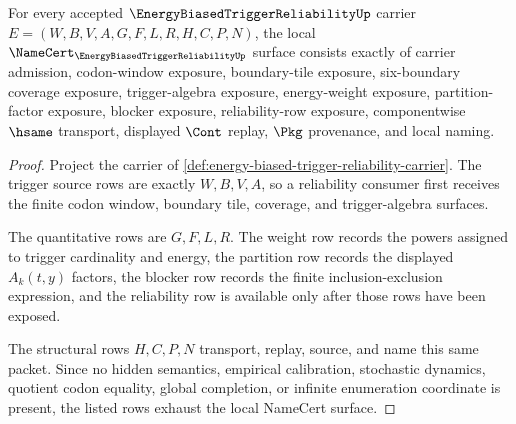 \begin{theorem}
\label{thm:energy-biased-trigger-reliability-namecert-obligations}
For every accepted $\EnergyBiasedTriggerReliabilityUp$ carrier $E=(W,B,V,A,G,F,L,R,H,C,P,N)$, the local $\NameCert_{\EnergyBiasedTriggerReliabilityUp}$ surface consists exactly of carrier admission, codon-window exposure, boundary-tile exposure, six-boundary coverage exposure, trigger-algebra exposure, energy-weight exposure, partition-factor exposure, blocker exposure, reliability-row exposure, componentwise $\hsame$ transport, displayed $\Cont$ replay, $\Pkg$ provenance, and local naming.
\end{theorem}
\begin{proof}
Project the carrier of \autoref{def:energy-biased-trigger-reliability-carrier}. The trigger source rows are exactly $W,B,V,A$, so a reliability consumer first receives the finite codon window, boundary tile, coverage, and trigger-algebra surfaces.

The quantitative rows are $G,F,L,R$. The weight row records the powers assigned to trigger cardinality and energy, the partition row records the displayed $A_k(t,y)$ factors, the blocker row records the finite inclusion-exclusion expression, and the reliability row is available only after those rows have been exposed.

The structural rows $H,C,P,N$ transport, replay, source, and name this same packet. Since no hidden semantics, empirical calibration, stochastic dynamics, quotient codon equality, global completion, or infinite enumeration coordinate is present, the listed rows exhaust the local NameCert surface.
\end{proof}


